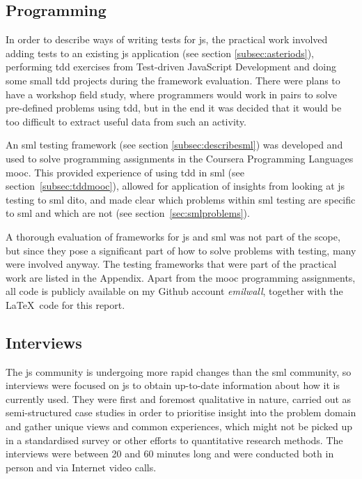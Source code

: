 \documentclass[11pt]{article}
\begin{document}
\subsection{Programming}
\label{subsec:programming}

In order to describe ways of writing tests for \gls{js}, the practical work involved adding tests to an existing \gls{js} application (see section \ref{subsec:asteriods}), performing \gls{tdd} exercises from Test-driven JavaScript Development \cite[part~III]{Tddjs} and doing some small \gls{tdd} projects during the framework evaluation. There were plans to have a workshop field study, where programmers would work in pairs to solve pre-defined problems using \gls{tdd}, but in the end it was decided that it would be too difficult to extract useful data from such an activity.

An \gls{sml} testing framework (see section \ref{subsec:describesml}) was developed and used to solve programming assignments in the Coursera Programming Languages \gls{mooc}. This provided experience of using \gls{tdd} in \gls{sml} (see section~\ref{subsec:tddmooc}), allowed for application of insights from looking at \gls{js} testing to \gls{sml} dito, and made clear which problems within \gls{sml} testing are specific to \gls{sml} and which are not (see section~\ref{sec:smlproblems}).

A thorough evaluation of frameworks for \gls{js} and \gls{sml} was not part of the scope, but since they pose a significant part of how to solve problems with testing, many were involved anyway. The testing frameworks that were part of the practical work are listed in the Appendix. Apart from the \gls{mooc} programming assignments, all code is publicly available on my Github account \emph{emilwall}, together with the \LaTeX~code for this report.

\subsection{Interviews}

The \gls{js} community is undergoing more rapid changes than the \gls{sml} community, so interviews were focused on \gls{js} to obtain up-to-date information about how it is currently used. They were first and foremost qualitative in nature, carried out as semi-structured case studies in order to prioritise insight into the problem domain and gather unique views and common experiences, which might not be picked up in a standardised survey or other efforts to quantitative research methods. The interviews were between 20 and 60 minutes long and were conducted both in person and via Internet video calls.
\end{document}
